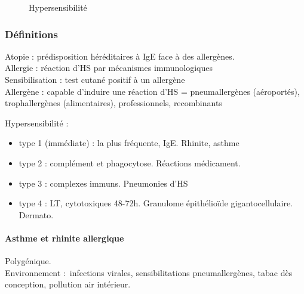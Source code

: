 \documentclass[11pt]{article}
\begin{document}
\begin{figure}[htpb]
  \centering
  \caption{Hypersensibilité}
\end{figure}
\subsubsection{Définitions}
\label{sec:orgb9ab656}
Atopie : prédisposition héréditaires à IgE face à des allergènes.\\
Allergie : réaction d'HS par mécanismes immunologiques\\
Sensibilisation : test cutané positif à un allergène\\
Allergène : capable d'induire une réaction d'HS = pneumallergènes (aéroportés),
trophallergènes (alimentaires), professionnels, recombinants

Hypersensibilité :

\begin{itemize}
\item type 1 (immédiate) : la plus fréquente, IgE. Rhinite, asthme
\item type 2 : complément et phagocytose. Réactions médicament.
\item type 3 : complexes immuns. Pneumonies d'HS
\item type 4 : LT, cytotoxiques 48-72h. Granulome épithélioïde gigantocellulaire.
Dermato.
\end{itemize}


\paragraph{Asthme et rhinite allergique}
\label{sec:org063bd56}
Polygénique.\\
Environnement : infections virales, sensibilitations pneumallergènes, tabac dès
conception, pollution air intérieur. 
\end{document}

